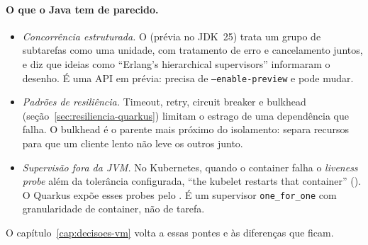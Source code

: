 \paragraph{O que o Java tem de parecido.}
\begin{itemize}
\item \emph{Concorrência estruturada.} O  (prévia
  no JDK~25) trata um grupo de subtarefas como uma unidade, com
  tratamento de erro e cancelamento juntos, e diz que ideias como
  \enquote{Erlang's hierarchical supervisors} informaram o desenho. É
  uma API em prévia: precisa de \texttt{--enable-preview} e pode mudar.
\item \emph{Padrões de resiliência.} Timeout, retry, circuit breaker e
  bulkhead (seção~\ref{sec:resiliencia-quarkus}) limitam o estrago de uma
  dependência que falha. O bulkhead é o parente mais próximo do
  isolamento: separa recursos para que um cliente lento não leve os
  outros junto.
\item \emph{Supervisão fora da JVM.} No Kubernetes, quando o container
  falha o \emph{liveness probe} além da tolerância configurada,
  \enquote{the kubelet restarts that container}
  (). O Quarkus expõe esses probes pelo
  . É um supervisor \texttt{one\_for\_one}
  com granularidade de container, não de tarefa.
\end{itemize}
O capítulo~\ref{cap:decisoes-vm} volta a essas pontes e às diferenças
que ficam.
